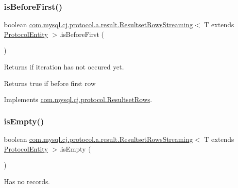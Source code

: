 \subsubsection{\texorpdfstring{is\+Before\+First()}{isBeforeFirst()}}
{\footnotesize\ttfamily boolean \mbox{\hyperlink{classcom_1_1mysql_1_1cj_1_1protocol_1_1a_1_1result_1_1_resultset_rows_streaming}{com.\+mysql.\+cj.\+protocol.\+a.\+result.\+Resultset\+Rows\+Streaming}}$<$ T extends \mbox{\hyperlink{interfacecom_1_1mysql_1_1cj_1_1protocol_1_1_protocol_entity}{Protocol\+Entity}} $>$.is\+Before\+First (\begin{DoxyParamCaption}{ }\end{DoxyParamCaption})}

Returns if iteration has not occured yet.

\begin{DoxyReturn}{Returns}
true if before first row 
\end{DoxyReturn}


Implements \mbox{\hyperlink{interfacecom_1_1mysql_1_1cj_1_1protocol_1_1_resultset_rows_a748205e182d8b1b1263ebe78c7062517}{com.\+mysql.\+cj.\+protocol.\+Resultset\+Rows}}.

\mbox{\label{classcom_1_1mysql_1_1cj_1_1protocol_1_1a_1_1result_1_1_resultset_rows_streaming_a477080ab4c378e7bf32d5c1230ecedbe}} 
\subsubsection{\texorpdfstring{is\+Empty()}{isEmpty()}}
{\footnotesize\ttfamily boolean \mbox{\hyperlink{classcom_1_1mysql_1_1cj_1_1protocol_1_1a_1_1result_1_1_resultset_rows_streaming}{com.\+mysql.\+cj.\+protocol.\+a.\+result.\+Resultset\+Rows\+Streaming}}$<$ T extends \mbox{\hyperlink{interfacecom_1_1mysql_1_1cj_1_1protocol_1_1_protocol_entity}{Protocol\+Entity}} $>$.is\+Empty (\begin{DoxyParamCaption}{ }\end{DoxyParamCaption})}

Has no records.


